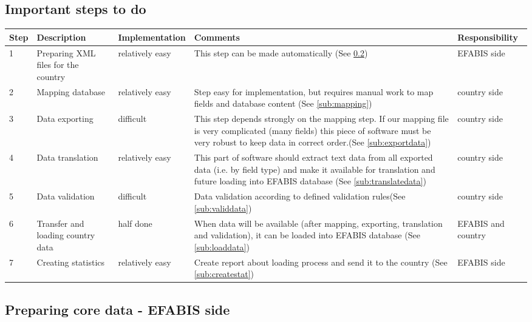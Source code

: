\begin{landscape}
\subsection{Important steps to do}

\begin{tabular}{|p{}|p{}|p{}|p{6 cm}|p{}|}
\hline Step& Description & Implementation &  	Comments & Responsibility\\ 
\hline  1&  Preparing XML files for the country& relatively easy    & This step can be made automatically (See \ref{sub:coredata})&EFABIS side\\ 
\hline  2&  Mapping database & relatively easy	 & Step easy for implementation, but requires manual work to map fields and database content (See \ref{sub:mapping})&country side\\ 
\hline  3&  Data exporting& difficult & This step depends strongly on the mapping step. If our mapping file is very complicated (many fields) this piece of software must be very robust to keep data in correct order.(See \ref{sub:exportdata})&country side \\ 
\hline  4&   Data translation&  relatively easy& This part of software should extract text data from all exported data (i.e. by field type) and make it available for translation and future loading into EFABIS database (See \ref{sub:translatedata})&country side\\ 
\hline	5& Data validation& difficult& Data validation according to defined validation rules(See \ref{sub:validdata})&country side\\
\hline  6& Transfer and loading country data	 & half done & When data will be available (after mapping, exporting, translation and validation), it can be loaded into EFABIS database (See \ref{sub:loaddata})&EFABIS and country\\ 
\hline	7& Creating statistics & relatively easy & Create report about loading process and send it to the country (See \ref{sub:createstat})&EFABIS side\\
\hline 
\end{tabular}
\end{landscape}

\subsection{Preparing core data - EFABIS side}
 \label{sub:coredata}

